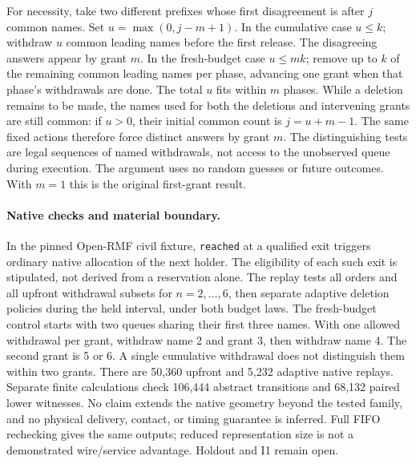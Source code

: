 \documentclass{article}
\begin{document}
For necessity, take two different prefixes whose first disagreement
is after \(j\) common names. Set \(u=\max(0,j-m+1)\).
In the cumulative case \(u\le k\); withdraw \(u\) common leading
names before the first release. The disagreeing answers appear by
grant \(m\). In the fresh-budget case \(u\le mk\); remove up to \(k\)
of the remaining common leading names per phase, advancing one grant
when that phase's withdrawals are done. The total \(u\) fits within
\(m\) phases. While a deletion remains to be made, the names used
for both the deletions and intervening grants are still common:
if \(u>0\), their initial common count is \(j=u+m-1\).
The same fixed actions therefore force distinct answers by grant \(m\).
The distinguishing tests are legal sequences of named withdrawals,
not access to the unobserved queue during execution. The argument
uses no random guesses or future outcomes. With \(m=1\) this is the
original first-grant result.

\paragraph{Native checks and material boundary.}
In the pinned Open-RMF civil fixture, \texttt{reached} at a qualified
exit triggers ordinary native allocation of the next holder. The
eligibility of each such exit is stipulated, not derived from a
reservation alone. The replay tests all orders and all upfront
withdrawal subsets for \(n=2,\ldots,6\), then separate adaptive
deletion policies during the held interval, under both budget laws.
The fresh-budget control starts with two queues sharing their first
three names. With one allowed withdrawal per grant, withdraw name
2 and grant 3, then withdraw name 4. The second grant is 5 or 6.
A single cumulative withdrawal does not distinguish them within two
grants. There are 50,360 upfront and 5,232 adaptive native replays. Separate finite
calculations check 106,444 abstract transitions and 68,132 paired lower
witnesses. No claim extends the native geometry beyond the
tested family, and no physical delivery, contact, or timing
guarantee is inferred. Full FIFO rechecking gives the same outputs;
reduced representation size is not a demonstrated wire/service
advantage. Holdout and I1 remain open.
\end{document}
